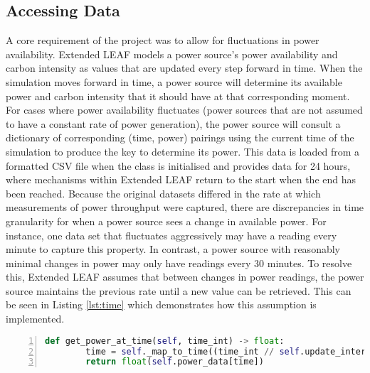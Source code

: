 \documentclass{l4proj}
\begin{document}
\subsection{Accessing Data}\label{imp:subsec:daa}
A core requirement of the project was to allow for fluctuations in power availability. Extended LEAF models a power source's power availability and carbon intensity as values that are updated every step forward in time.
When the simulation moves forward in time, a power source will determine its available power and carbon intensity that it should have at that corresponding moment.
For cases where power availability fluctuates (power sources that are not assumed to have a constant rate of power generation), the power source will consult a dictionary of corresponding (time, power) pairings using the current time of the simulation to produce the key to determine its power.
This data is loaded from a formatted CSV file when the class is initialised and provides data for 24 hours, where mechanisms within Extended LEAF return to the start when the end has been reached.
Because the original datasets differed in the rate at which measurements of power throughput were captured, there are discrepancies in time granularity for when a power source sees a change in available power.
For instance, one data set that fluctuates aggressively may have a reading every minute to capture this property.
In contrast, a power source with reasonably minimal changes in power may only have readings every 30 minutes.
To resolve this, Extended LEAF assumes that between changes in power readings, the power source maintains the previous rate until a new value can be retrieved.
This can be seen in Listing \ref{lst:time} which demonstrates how this assumption is implemented.\\

\begin{lstlisting}[language=python, numbers=left, caption={Example use of how a power source accesses it's available power.}, label=lst:time]
    def get_power_at_time(self, time_int) -> float:
        time = self._map_to_time((time_int // self.update_interval) % len(self.power_data))
        return float(self.power_data[time])
\end{lstlisting}
\end{document}
